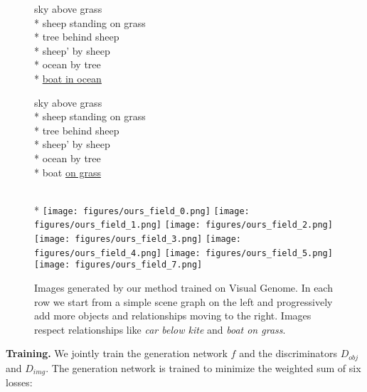 \documentclass[10pt,twocolumn,letterpaper]{article}
\begin{document}
\begin{figure*}[ht]
  \begin{minipage}{\progsize}
    \centering
    \ssmall
    sky above grass \\*
    sheep standing on grass \\*
    tree behind sheep \\*
    sheep' by sheep \\*
    ocean by tree \\*
    \underline{boat in ocean}
  \end{minipage}
  \begin{minipage}{\progsize}
    \centering
    \ssmall
    sky above grass \\*
    sheep standing on grass \\*
    tree behind sheep \\*
    sheep' by sheep \\*
    ocean by tree \\*
    boat \underline{on grass}
  \end{minipage} \\*
  \texttt{[image: figures/ours\_field\_0.png]}
  \texttt{[image: figures/ours\_field\_1.png]}
  \texttt{[image: figures/ours\_field\_2.png]}
  \texttt{[image: figures/ours\_field\_3.png]}
  \texttt{[image: figures/ours\_field\_4.png]}
  \texttt{[image: figures/ours\_field\_5.png]}
  \texttt{[image: figures/ours\_field\_7.png]}
  \caption{
    Images generated by our method trained on Visual Genome. In each row we
    start from a simple scene graph on the left and progressively add more
    objects and relationships moving to the right. Images respect
    relationships like \emph{car below kite} and \emph{boat on grass}.
  }
  \vspace{-4mm}
  \label{fig:manual}
\end{figure*}
 
\textbf{Training.}
We jointly train the generation network $f$ and the discriminators $D_{obj}$
and $D_{img}$. The generation network is trained to minimize the weighted sum of
six losses:
\end{document}
